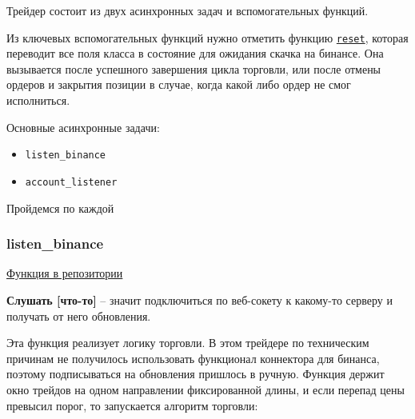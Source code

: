 Трейдер состоит из двух асинхронных задач и вспомогательных функций. 

Из ключевых вспомогательных функций нужно отметить функцию \href{https://github.com/dexety/dex-trading-system/blob/main/research/ib-0002-cross-analysis/trader.py#L303}{\texttt{reset}}, которая переводит все поля класса в состояние для ожидания скачка на бинансе. Она вызывается после успешного завершения цикла торговли, или после отмены ордеров и закрытия позиции в случае, когда какой либо ордер не смог исполниться.

Основные асинхронные задачи:
\begin{itemize}
    \item \texttt{listen\_binance}
    \item \texttt{account\_listener}
\end{itemize}

Пройдемся по каждой

\subsubsection{listen\_binance}

\href{https://github.com/dexety/dex-trading-system/blob/main/research/ib-0002-cross-analysis/trader.py#L167}{Функция в репозитории}

\begin{definition}
\textbf{Слушать [что-то]} -- значит подключиться по веб-сокету к какому-то серверу и получать от него обновления.
\end{definition} 

Эта функция реализует логику торговли. В этом трейдере по техническим причинам не получилось использовать функционал коннектора для бинанса, поэтому подписываться на обновления пришлось в ручную. Функция держит окно трейдов на одном направлении фиксированной длины, и если перепад цены превысил порог, то запускается алгоритм торговли:

